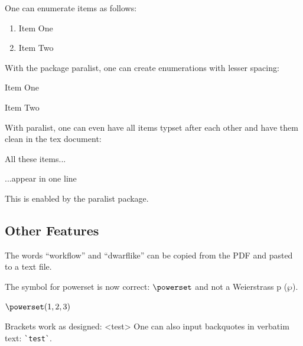 \documentclass[conference,a4paper,english]{IEEEtran}[2015/08/26]
\begin{document}
One can enumerate items as follows:

\begin{ltgexample}
\begin{enumerate}
  \item Item One
  \item Item Two
\end{enumerate}
\end{ltgexample}

With the package paralist, one can create enumerations with lesser spacing:

\begin{ltgexample}
\begin{compactenum}
  \item Item One
  \item Item Two
\end{compactenum}
\end{ltgexample}

With paralist, one can even have all items typset after each other and have them clean in the tex document:

\begin{ltgexample}
\begin{inparaenum}
  \item All these items...
  \item ...appear in one line
  \item This is enabled by the paralist package.
\end{inparaenum}
\end{ltgexample}

\subsection{Other Features}

\begin{ltgexample}
The words \enquote{workflow} and \enquote{dwarflike} can be copied from the PDF and pasted to a text file.
\end{ltgexample}

\begin{ltgexample}
The symbol for powerset is now correct: $\powerset$ and not a Weierstrass p ($\wp$).

$\powerset({1,2,3})$
\end{ltgexample}

\begin{ltgexample}
Brackets work as designed:
<test>
One can also input backquotes in verbatim text: \verb|`test`|.
\end{ltgexample}
\end{document}
